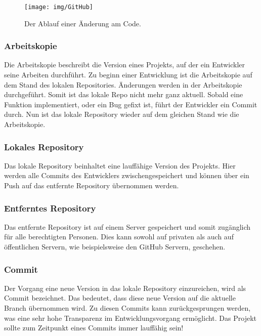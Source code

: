 \documentclass[FIPLY_base.tex]{subfiles}
\begin{document}
\begin{wrapfigure}{r}{0.20\textwidth}
\begin{center}
	\texttt{[image: img/GitHub]}
	\caption{Der Ablauf einer Änderung am Code.}
	\vspace{-90pt}
\end{center}
\end{wrapfigure}

\subsubsection{Arbeitskopie}
Die Arbeitskopie beschreibt die Version eines Projekts, auf der ein Entwickler seine Arbeiten durchführt.
Zu beginn einer Entwicklung ist die Arbeitskopie auf dem Stand des lokalen Repositories.
Änderungen werden in der Arbeitskopie durchgeführt. Somit ist das lokale Repo nicht mehr ganz aktuell.
Sobald eine Funktion implementiert, oder ein Bug gefixt ist, führt der Entwickler ein Commit durch.
Nun ist das lokale Repository wieder auf dem gleichen Stand wie die Arbeitskopie.

\subsubsection{Lokales Repository}
Das lokale Repository beinhaltet eine lauffähige Version des Projekts.
Hier werden alle Commits des Entwicklers zwischengespeichert und können über ein Push auf das entfernte Repository übernommen werden.

\subsubsection{Entferntes Repository}
Das entfernte Repository ist auf einem Server gespeichert und somit zugänglich für alle berechtigten Personen.
Dies kann sowohl auf privaten als auch auf öffentlichen Servern, wie beispielsweise den GitHub Servern, geschehen.

\subsubsection{Commit}
Der Vorgang eine neue Version in das lokale Repository einzureichen, wird als Commit bezeichnet.
Das bedeutet, dass diese neue Version auf die aktuelle Branch übernommen wird.
Zu diesen Commits kann zurückgesprungen werden, was eine sehr hohe Transparenz im Entwicklungsvorgang ermöglicht.
Das Projekt sollte zum Zeitpunkt eines Commits immer lauffähig sein! 
 
\end{document}
